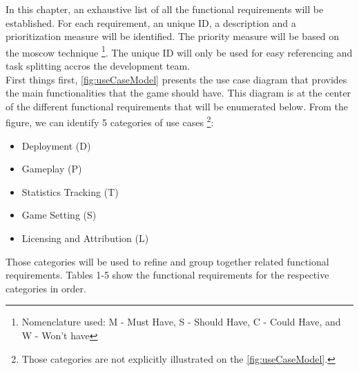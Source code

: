 
In this chapter, an exhaustive list of all the functional requirements will be established. For each requirement, an unique ID, a description and a prioritization measure will be identified. The priority measure will be based on the \gls{moscow} technique \cite{brennan2009} \footnote{Nomenclature used: M - Must Have, S - Should Have, C - Could Have, and W - Won't have}. The unique ID will only be used for easy referencing and task splitting accros the development team. \\

First things first, \autoref{fig:useCaseModel} presents the use case diagram that provides the main functionalities that the game should have. This diagram is at the center of the different functional requirements that will be enumerated below. From the figure, we can identify 5 categories of use cases \footnote{Those categories are not explicitly illustrated on the \autoref{fig:useCaseModel}.}:
\begin{itemize}
  \item Deployment (D)
  \item Gameplay (P)
  \item Statistics Tracking (T)
  \item Game Setting (S)
  \item Licensing and Attribution (L)
\end{itemize}
Those categories will be used to refine and group together related functional requirements. Tables 1-5 show the functional requirements for the respective categories in order.

